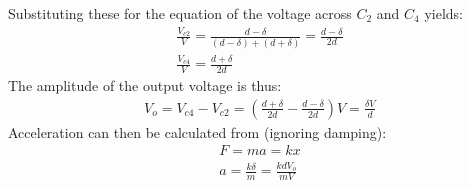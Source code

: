 Substituting these for the equation of the voltage across $C_2$ and $C_4$ yields:
\begin{gather}
  \frac{V_{c2}}{V} = \frac{d-\delta}{(d-\delta)+(d+\delta)} = \frac{d-\delta}{2d} \\[10pt]
  \frac{V_{c4}}{V} = \frac{d+\delta}{2d}
\end{gather}
The amplitude of the output voltage is thus:
\begin{gather}
  V_o = V_{c4}-V_{c2} = \left(\frac{d+\delta}{2d}-\frac{d-\delta}{2d}\right)V = \frac{\delta V}{d}
\end{gather}
Acceleration can then be calculated from (ignoring damping):
\begin{gather}
  F = ma = kx \\
  a = \frac{k\delta}{m} = \frac{kdV_o}{mV}
\end{gather}